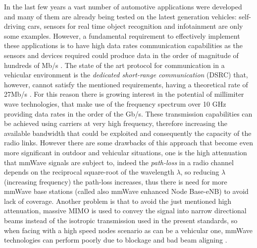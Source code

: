 \documentclass[conference,10pt]{IEEEtran}
\begin{document}
In the last few years a vast number of automotive applications were developed and many of them are already being tested on the latest generation vehicles: self-driving cars, sensors for real time object recognition and infotainment are only some examples. However, a fundamental requirement to effectively implement these applications is to have high data rates communication capabilities as the sensors and devices required could produce data in the order of magnitude of hundreds of Mb/s \cite{surveh}.
The state of the art protocol for communication in a vehicular environment is the \emph{dedicated short-range communication} (DSRC) that, however, cannot satisfy the mentioned requirements, having a theoretical rate of 27Mb/s \cite{surveh}. For this reason there is growing interest in the potential of millimiter wave technologies, that make use of the frequency spectrum over 10 GHz providing data rates in the order of the Gb/s. These transmission capabilities can be achieved using carriers at very high frequency, therefore increasing the available bandwidth that could be exploited and consequently the capacity of the radio links. However there are some drawbacks of this approach that become even more significant in outdoor and vehicular situations, one is the high attenuation that mmWave signals are subject to, indeed the \emph{path-loss} in a radio channel depends on the reciprocal square-root of the wavelength $\lambda$, so reducing $\lambda$ (increasing frequency) the path-loss increases, thus there is need for more mmWave base stations (called also mmWave enhanced Node Base-eNB) to avoid lack of coverage. Another problem is that to avoid the just mentioned high attenuation, massive MIMO is used to convey the signal into narrow directional beams instead of the isotropic transmission used in the present standards, so when facing with a high speed nodes scenario as can be a vehicular one, mmWave technologies can perform poorly due to blockage and bad beam aligning \cite{mmvehicle}.
\end{document}
